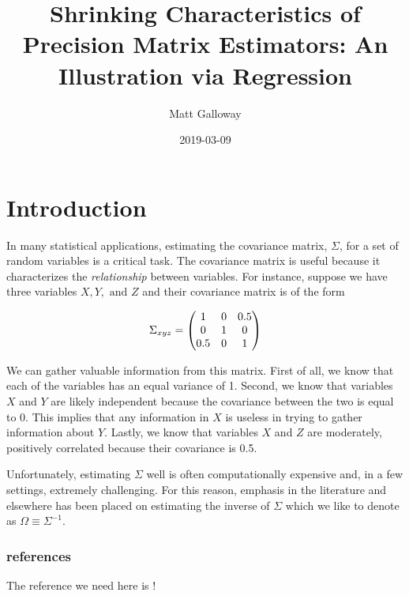 \documentclass[11pt,]{report}
\title{Shrinking Characteristics of Precision Matrix Estimators: An Illustration via Regression}
\author{Matt Galloway}
\date{2019-03-09}
\begin{document}
\maketitle

{
\hypersetup{linkcolor=}
\setcounter{tocdepth}{1}
\tableofcontents
}
\hypertarget{intro}{%
\chapter{Introduction}\label{intro}}

In many statistical applications, estimating the covariance matrix, \(\Sigma\), for a set of random variables is a critical task. The covariance matrix is useful because it characterizes the \emph{relationship} between variables. For instance, suppose we have three variables \(X, Y, \mbox{ and } Z\) and their covariance matrix is of the form

\begin{equation}
\Sigma_{xyz} = \begin{pmatrix}
1 & 0 & 0.5 \\ 
0 & 1 & 0 \\ 
0.5 & 0 & 1
\end{pmatrix}
\label{eq:ex}\notag
\end{equation}

We can gather valuable information from this matrix. First of all, we know that each of the variables has an equal variance of 1. Second, we know that variables \(X\) and \(Y\) are likely independent because the covariance between the two is equal to 0. This implies that any information in \(X\) is useless in trying to gather information about \(Y\). Lastly, we know that variables \(X\) and \(Z\) are moderately, positively correlated because their covariance is 0.5.

Unfortunately, estimating \(\Sigma\) well is often computationally expensive and, in a few settings, extremely challenging. For this reason, emphasis in the literature and elsewhere has been placed on estimating the inverse of \(\Sigma\) which we like to denote as \(\Omega \equiv \Sigma^{-1}\).

\hypertarget{references}{%
\subsection{references}\label{references}}

The reference we need here is \citet{molstad2017shrinking}!
\end{document}
